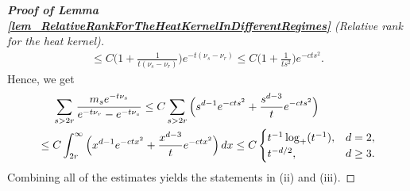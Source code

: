 \documentclass[a4paper,11pt]{article} %
\numberwithin{equation}{section}
\theoremstyle{definition}
\theoremstyle{remark}
\theoremstyle{plain}
\begin{document}
\begin{proof}[\normalfont \textbf{Proof of Lemma \ref{lem_RelativeRankForTheHeatKernelInDifferentRegimes}} (Relative rank for the heat kernel)]
\begin{align}
    \le
    C \Big( 1 + \frac{1}{t(\nu_s - \nu_r)} \Big) e^{-t (\nu_s - \nu_r)}
    \le
    C \Big( 1 + \frac{1}{t s^2} \Big) e^{-c t s^2}.
  \end{align}
  Hence, we get
  \begin{align}
    & \ \ \ \
        \sum_{s > 2 r} \frac{m_{s} e^{-t \nu_s}}{e^{-t \nu_r} - e^{-t \nu_s}} 
    \le 
        C \sum_{s > 2 r} \Big( s^{d - 1} e^{-c t s^2} + \frac{s^{d - 3}}{t} e^{-c t s^2} \Big)
    \\
    & \le
        C \int_{2 r}^\infty \Big( x^{d - 1} e^{-c t x^2} + \frac{x^{d - 3}}{t} e^{-c t x^2} \Big) \, dx
    \le
        C \begin{cases}
            t^{-1}     \log_+( t^{-1}), & d = 2, \\ 
            t^{- d/2},              & d \ge 3. 
          \end{cases}
    \notag
  \end{align}
  Combining all of the estimates yields the statements in (ii) and (iii). 


\end{proof}
\end{document}

